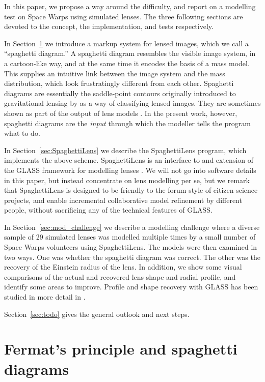 \documentclass[usenatbib]{mn2e}
\newcommand{\spl}{SpaghettiLens\xspace}
\newcommand{\sw}{Space Warps\xspace}
\newcommand{\secref}[1]{Section~\ref{sec:#1}}
\begin{document}
In this paper, we propose a way around the difficulty, and report on a
modelling test on \sw using simulated lenses.  The three following
sections are devoted to the concept, the implementation, and tests
respectively.

In \secref{Fermat} we introduce a markup system for lensed images,
which we call a ``spaghetti diagram.''  A spaghetti diagram resembles
the visible image system, in a cartoon-like way, and at the same time
it encodes the basis of a mass model.  This supplies an intuitive link
between the image system and the mass distribution, which look
frustratingly different from each other.  Spaghetti diagrams are
essentially the saddle-point contours originally introduced to
gravitational lensing by \cite{1986ApJ...310..568B} as a way of
classifying lensed images.  They are sometimes shown as part of the
output of lens models \citep[for
example][]{2001ApJ...557..594R,2003ApJ...590...39K,Lubini2012}.  In
the present work, however, spaghetti diagrams are the {\em input\/}
through which the modeller tells the program what to do.

In \secref{SpaghettiLens} we describe the \spl program, which
implements the above scheme.  \spl is an interface to and
extension of the GLASS framework for modelling lenses
\citep{2014arXiv1401.7990C}.  We will not go into software details in
this paper, but instead concentrate on lens modelling per se, but we
remark that \spl is designed to be friendly to the forum style of
citizen-science projects, and enable incremental collaborative
model refinement by different people, without sacrificing any of the
technical features of GLASS.

In \secref{mod_challenge} we describe a modelling challenge where a
diverse sample of 29 simulated lenses was modelled multiple times
by a small number of \sw volunteers using \spl.  The models
were then examined in two ways.  One was whether the spaghetti diagram
was correct.  The other was the recovery of the Einstein radius of the
lens.  In addition, we show some visual comparisons of the actual and
recovered lens shape and radial profile, and identify some areas to
improve. Profile and shape recovery with GLASS has been studied in
more detail in \citep{2014arXiv1401.7990C}.

\secref{todo} gives the general outlook and next steps.


\section{Fermat's principle and spaghetti diagrams} \label{sec:Fermat}
\end{document}
